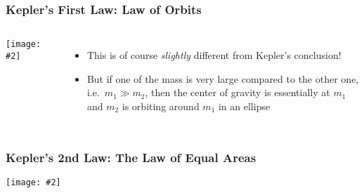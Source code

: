 \documentclass[12pt,compress,aspectratio=169]{beamer}
\newcommand{\pic}[2]{\texttt{[image: \#2]}}
\begin{document}
\begin{frame}
  \frametitle{Kepler's First Law: Law of Orbits}
  \begin{columns}
    \vspace{.2in}\pic{1.2}{kepo17.png}
    
    \begin{center}
    \end{center}
    \begin{itemize}
    \item This is of course \emph{slightly} different from Kepler's conclusion!
    \item But if one of the mass is very large compared to the other one,
      i.e.\ $m_1\gg m_2$, then the center of gravity is essentially at $m_1$
      and $m_2$ is orbiting around $m_1$ in an ellipse
    \end{itemize}
  \end{columns}
\end{frame}



\begin{frame}
  \frametitle{Kepler's 2nd Law: The Law of Equal Areas}

  \vspace{.2in}
  \begin{center}

    \pic{.6}{201532-132212364-3243-planet.jpg}
  \end{center}
\end{frame}
\end{document}
